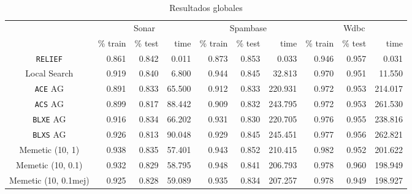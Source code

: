 \documentclass[11pt]{article}
\theoremstyle{plain}
\theoremstyle{definition}
\begin{document}
\begin{table}[H]
\centering
\caption{Resultados globales}
\label{tbl-glob}
\begin{tabular}{@{}crrrrrrrrr@{}}
  \toprule
  & \multicolumn{3}{c}{Sonar} & \multicolumn{3}{c}{Spambase} & \multicolumn{3}{c}{Wdbc}  \\
  \cmidrule(r){2-10}
           & \% train & \% test & time & \% train   & \% test   & time & \% train & \% test & time \\
  \midrule
\texttt{RELIEF}      & 0.861 & 0.842 & 0.011  & 0.873 & 0.853 & 0.033   & 0.946 & 0.957 & 0.031   \\
Local Search & 0.919 & 0.840 & 6.800  & 0.944 & 0.845 & 32.813  & 0.970 & 0.951 & 11.550  \\
\texttt{ACE} AG & 0.891 & 0.833 & 65.500 & 0.912 & 0.833 & 220.931 & 0.972 & 0.953 & 214.017 \\
\texttt{ACS} AG & 0.899 & 0.817 & 88.442 & 0.909 & 0.832 & 243.795 & 0.972 & 0.953 & 261.530 \\
\texttt{BLXE} AG & 0.916 & 0.834 & 66.202 & 0.931 & 0.830 & 220.705 & 0.976 & 0.955 & 238.816 \\
\texttt{BLXS} AG & 0.926 & 0.813 & 90.048 & 0.929 & 0.845 & 245.451 & 0.977 & 0.956 & 262.821 \\
Memetic (10, 1) & 0.938 & 0.835 & 57.401 & 0.943 & 0.852 & 210.415 & 0.982 & 0.952 & 201.622 \\
Memetic (10, 0.1) & 0.932 & 0.829 & 58.795 & 0.948 & 0.841 & 206.793 & 0.978 & 0.960 & 198.949 \\
Memetic (10, 0.1mej) & 0.925 & 0.828 & 59.089 & 0.935 & 0.834 & 207.257 & 0.978 & 0.949 & 198.927 \\
  \bottomrule
\end{tabular}
\end{table}
\end{document}
